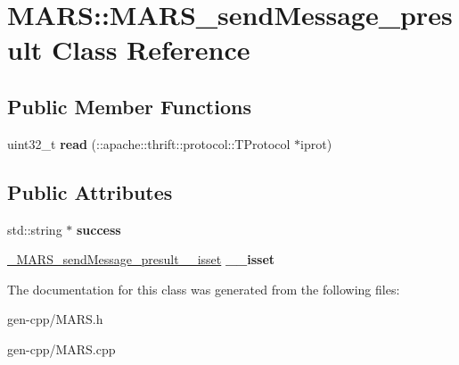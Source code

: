 \hypertarget{classMARS_1_1MARS__sendMessage__presult}{}\section{M\+A\+RS\+:\+:M\+A\+R\+S\+\_\+send\+Message\+\_\+presult Class Reference}
\label{classMARS_1_1MARS__sendMessage__presult}
\subsection*{Public Member Functions}
\begin{DoxyCompactItemize}
\item 
\mbox{\label{classMARS_1_1MARS__sendMessage__presult_a0081bdd3b2b3d5e6561c736a057c15b6}} 
uint32\+\_\+t {\bfseries read} (\+::apache\+::thrift\+::protocol\+::\+T\+Protocol $\ast$iprot)
\end{DoxyCompactItemize}
\subsection*{Public Attributes}
\begin{DoxyCompactItemize}
\item 
\mbox{\label{classMARS_1_1MARS__sendMessage__presult_a06a41325559e0f9f8d37b142d187f179}} 
std\+::string $\ast$ {\bfseries success}
\item 
\mbox{\label{classMARS_1_1MARS__sendMessage__presult_af676f944eae48ed4b1d371ad63ecbe78}} 
\hyperlink{structMARS_1_1__MARS__sendMessage__presult____isset}{\+\_\+\+M\+A\+R\+S\+\_\+send\+Message\+\_\+presult\+\_\+\+\_\+isset} {\bfseries \+\_\+\+\_\+isset}
\end{DoxyCompactItemize}


The documentation for this class was generated from the following files\+:\begin{DoxyCompactItemize}
\item 
gen-\/cpp/M\+A\+R\+S.\+h\item 
gen-\/cpp/M\+A\+R\+S.\+cpp\end{DoxyCompactItemize}

